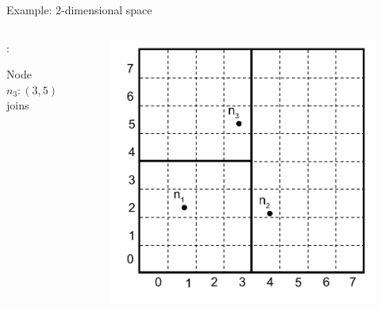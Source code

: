 \begin{frame}{Example: 2-dimensional space}

\begin{columns}
\begin{column}{0.5\textwidth}
:\\
\BI
\item Node $n_3:(3, 5)$ joins
\EI
\end{column}
\begin{column}{0.5\textwidth}
\begin{figure}
	\includegraphics[width=1.0\textwidth]{figs/10/can3}
\end{figure}
\end{column}
\end{columns}
		
\end{frame}	

